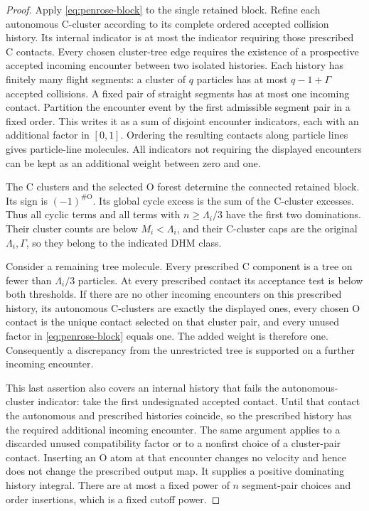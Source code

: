 \begin{proof}
Apply \eqref{eq:penrose-block} to the single retained block.  Refine each
autonomous C-cluster according to its complete ordered accepted
collision history.  Its internal indicator is at most the indicator
requiring those prescribed C contacts.  Every chosen cluster-tree edge
requires the existence of a prospective accepted incoming encounter
between two isolated histories.  Each history has finitely many flight
segments: a cluster of $q$ particles has at most $q-1+\Gamma$ accepted
collisions.  A fixed pair of straight segments has at most one incoming
contact.  Partition the encounter event by the first admissible segment
pair in a fixed order.  This writes it as a sum of disjoint encounter
indicators, each with an additional factor in $[0,1]$.  Ordering the
resulting contacts along particle lines gives particle-line molecules.
All indicators not requiring the displayed encounters can be kept as
an additional weight between zero and one.

The C clusters and the selected O forest determine the connected
retained block.  Its sign is $(-1)^{\#\mathrm O}$.  Its global cycle
excess is the sum of the C-cluster excesses.  Thus all cyclic terms and
all terms with $n\ge\Lambda_i/3$ have the first two dominations.  Their
cluster counts are below $M_i<\Lambda_i$, and their C-cluster caps are
the original $\Lambda_i,\Gamma$, so they belong to the indicated DHM
class.

Consider a remaining tree molecule.  Every prescribed C component is a
tree on fewer than $\Lambda_i/3$ particles.  At every prescribed contact
its acceptance test is below both thresholds.  If there are no other
incoming encounters on this prescribed history, its autonomous
C-clusters are exactly the displayed ones, every chosen O contact is
the unique contact selected on that cluster pair, and every unused
factor in \eqref{eq:penrose-block} equals one.  The added weight is
therefore one.  Consequently a discrepancy from the unrestricted tree
is supported on a further incoming encounter.

This last assertion also covers an internal history that fails the
autonomous-cluster indicator: take the first undesignated accepted
contact.  Until that contact the autonomous and prescribed histories
coincide, so the prescribed history has the required additional incoming
encounter.  The same argument applies to a discarded unused
compatibility factor or to a nonfirst choice of a cluster-pair contact.
Inserting an O atom at that encounter changes no velocity and hence
does not change the prescribed output map.  It supplies a positive
dominating history integral.  There are at most a fixed power of $n$
segment-pair choices and order insertions, which is a fixed cutoff
power.


\end{proof}
